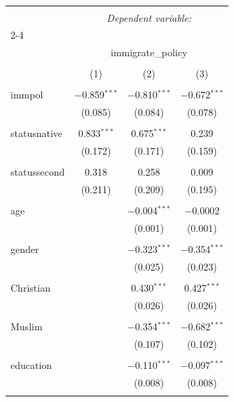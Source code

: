 
\begin{table}[!htbp] \centering 
  \caption{} 
  \label{} 
\begin{tabular}{@{\extracolsep{5pt}}lccc} 
\\[-1.8ex]\hline 
\hline \\[-1.8ex] 
 & \multicolumn{3}{c}{\textit{Dependent variable:}} \\ 
\cline{2-4} 
\\[-1.8ex] & \multicolumn{3}{c}{immigrate\_policy} \\ 
\\[-1.8ex] & (1) & (2) & (3)\\ 
\hline \\[-1.8ex] 
 immpol & $-$0.859$^{***}$ & $-$0.810$^{***}$ & $-$0.672$^{***}$ \\ 
  & (0.085) & (0.084) & (0.078) \\ 
  & & & \\ 
 statusnative & 0.833$^{***}$ & 0.675$^{***}$ & 0.239 \\ 
  & (0.172) & (0.171) & (0.159) \\ 
  & & & \\ 
 statussecond & 0.318 & 0.258 & 0.009 \\ 
  & (0.211) & (0.209) & (0.195) \\ 
  & & & \\ 
 age &  & $-$0.004$^{***}$ & $-$0.0002 \\ 
  &  & (0.001) & (0.001) \\ 
  & & & \\ 
 gender &  & $-$0.323$^{***}$ & $-$0.354$^{***}$ \\ 
  &  & (0.025) & (0.023) \\ 
  & & & \\ 
 Christian &  & 0.430$^{***}$ & 0.427$^{***}$ \\ 
  &  & (0.026) & (0.026) \\ 
  & & & \\ 
 Muslim &  & $-$0.354$^{***}$ & $-$0.682$^{***}$ \\ 
  &  & (0.107) & (0.102) \\ 
  & & & \\ 
 education &  & $-$0.110$^{***}$ & $-$0.097$^{***}$ \\ 
  &  & (0.008) & (0.008) \\ 
  & & & \\ 

\end{tabular}
\end{table}
